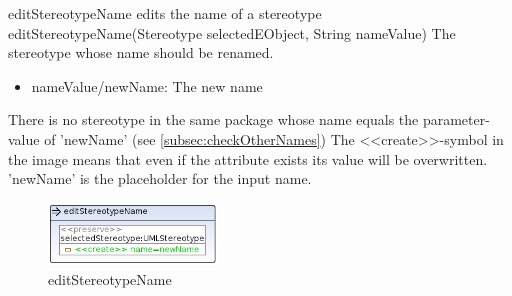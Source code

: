 \op
{editStereotypeName}
{edits the name of a stereotype}
{editStereotypeName(Stereotype selectedEObject, String nameValue)}
{The stereotype whose name should be renamed.}
{
\begin{itemize}
 \item nameValue/newName: The new name
\end{itemize}
}
{There is no stereotype in the same package whose name equals the parameter-value of
'newName' (see
\ref{subsec:checkOtherNames})}
{The \textless\textless create\textgreater\textgreater  -symbol in the image
means that even if the attribute exists its value will be overwritten.
'newName' is the placeholder for the input name.}
\begin{figure}[H]
  \centering
  \includegraphics[width=0.4\textwidth]{pics/editStereotypeName.png}
  \caption{editStereotypeName}
  \label{editStereotypeName}
\end{figure}